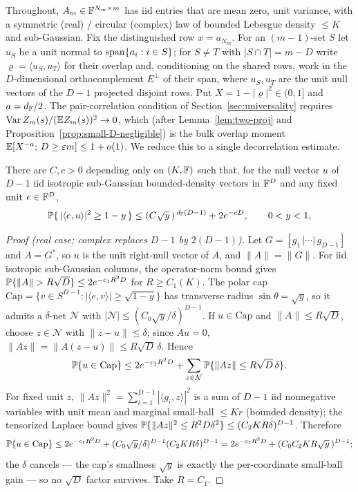 
Throughout, $A_m\in\mathbb{F}^{N_m\times m}$ has iid entries that are mean zero, unit variance, with a
symmetric (real) / circular (complex) law of bounded Lebesgue density $\le K$ and sub-Gaussian.
Fix the distinguished row $x=a_{N_m}$.  For an $(m-1)$-set $S$ let $u_S$ be a unit normal to
$\operatorname{span}\{a_i:i\in S\}$; for $S\ne T$ with $|S\cap T|=m-D$ write $\varrho=\langle u_S,u_T\rangle$ for
their overlap and, conditioning on the shared rows, work in the $D$-dimensional orthocomplement
$E^\perp$ of their span, where $u_S,u_T$ are the unit null vectors of the $D-1$ projected disjoint
rows.  Put $X=1-|\varrho|^2\in(0,1]$ and $a=d_{\mathbb{F}}/2$.  The pair-correlation condition of
Section~\ref{sec:universality} requires $\operatorname{Var} Z_m(s)/(\mathbb{E} Z_m(s))^2\to0$, which (after
Lemma~\ref{lem:two-proj} and Proposition~\ref{prop:small-D-negligible}) is the bulk overlap moment
$\mathbb{E}[X^{-a};\,D\ge\varepsilon m]\le1+o(1)$.  We reduce this to a single decorrelation estimate.

\begin{lemma}\label{appB:tail}
There are $C,c>0$ depending only on $(K,\mathbb{F})$ such that, for the null vector $u$ of $D-1$ iid
isotropic sub-Gaussian bounded-density vectors in $\mathbb{F}^D$ and any fixed unit $e\in\mathbb{F}^D$,
\[
  \mathbb{P}\{\,|\langle e,u\rangle|^2\ge 1-y\,\}\le (C\sqrt y\,)^{\,d_{\mathbb{F}}(D-1)}+2e^{-cD},
  \qquad 0<y<1 ,
\]
\end{lemma}

\begin{proof}[Proof (real case; complex replaces $D-1$ by $2(D-1)$)]
Let $G=[g_1\,|\cdots|\,g_{D-1}]$ and $A=G^*$, so $u$ is the unit right-null vector of $A$, and
$\|A\|=\|G\|$.  For iid isotropic sub-Gaussian columns, the operator-norm bound
\cite{Vershynin2018} gives $\PP\{\|A\|>R\sqrt D\}\le2e^{-c_1R^2D}$ for $R\ge C_1(K)$.  The polar
cap $\mathrm{Cap}=\{v\in S^{D-1}:|\langle e,v\rangle|\ge\sqrt{1-y}\}$ has transverse radius
$\sin\theta=\sqrt y$, so it admits a $\delta$-net $\mathcal N$ with
$|\mathcal N|\le(C_0\sqrt y/\delta)^{D-1}$.  If $u\in\mathrm{Cap}$ and $\|A\|\le R\sqrt D$, choose
$z\in\mathcal N$ with $\|z-u\|\le\delta$; since $Au=0$, $\|Az\|=\|A(z-u)\|\le R\sqrt D\,\delta$.
Hence
\[
  \mathbb{P}\{u\in\mathrm{Cap}\}\le 2e^{-c_1R^2D}+\sum_{z\in\mathcal N}\mathbb{P}\{\|Az\|\le R\sqrt D\,\delta\}.
\]
For fixed unit $z$, $\|Az\|^2=\sum_{i=1}^{D-1}|\langle g_i,z\rangle|^2$ is a sum of $D-1$ iid
nonnegative variables with unit mean and marginal small-ball $\le Kr$ (bounded density); the
tensorized Laplace bound \cite{RudelsonVershynin2008} gives
$\mathbb{P}\{\|Az\|^2\le R^2D\delta^2\}\le(C_2KR\delta)^{D-1}$.  Therefore
\[
  \mathbb{P}\{u\in\mathrm{Cap}\}\le2e^{-c_1R^2D}+(C_0\sqrt y/\delta)^{D-1}(C_2KR\delta)^{D-1}
   =2e^{-c_1R^2D}+(C_0C_2KR\sqrt y\,)^{D-1};
\]
the $\delta$ cancels --- the cap's smallness $\sqrt y$ is exactly the per-coordinate small-ball
gain --- so no $\sqrt D$ factor survives.  Take $R=C_1$.
\end{proof}

